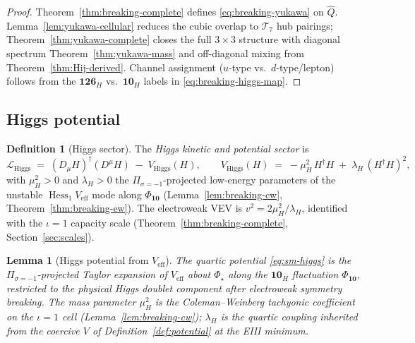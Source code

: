 \documentclass[11pt]{article}
\theoremstyle{plain}
\newtheorem{lemma}[theorem]{Lemma}
\theoremstyle{definition}
\newtheorem{definition}[theorem]{Definition}
\theoremstyle{remark}
\numberwithin{equation}{section}
\newcommand{\orderparam}{\Phi}
\newcommand{\Hess}{\operatorname{Hess}}
\begin{document}
\begin{proof}
Theorem~\ref{thm:breaking-complete} defines \eqref{eq:breaking-yukawa} on
$\hat Q$. Lemma~\ref{lem:yukawa-cellular} reduces the cubic overlap to
$\mathcal{T}_7$ hub pairings; Theorem~\ref{thm:yukawa-complete} closes the
full $3\times3$ structure with diagonal spectrum
Theorem~\ref{thm:yukawa-mass} and off-diagonal mixing from
Theorem~\ref{thm:Hij-derived}. Channel assignment
($u$-type vs.\ $d$-type/lepton) follows from the $\mathbf{126}_H$ vs.\
$\mathbf{10}_H$ labels in \eqref{eq:breaking-higgs-map}.
\end{proof}

\subsection{Higgs potential}
\label{sec:sm-lagrangian:higgs}

\begin{definition}[Higgs sector]\label{def:sm-higgs}
The \emph{Higgs kinetic and potential sector} is
\begin{equation}\label{eq:sm-higgs}
  \mathcal{L}_{\mathrm{Higgs}}
  \;=\;
  (D_\mu H)^\dagger(D^\mu H)
  \;-\;
  V_{\mathrm{Higgs}}(H),
  \qquad
  V_{\mathrm{Higgs}}(H)
  \;=\;
  -\mu_H^2\,H^\dagger H
  \;+\;
  \lambda_H\,(H^\dagger H)^2,
\end{equation}
with $\mu_H^2>0$ and $\lambda_H>0$ the $\Pi_{\sigma=-1}$-projected low-energy
parameters of the unstable $\Hess_1 V_{\mathrm{eff}}$ mode along
$\Phi_{\mathbf{10}}$ (Lemma~\ref{lem:breaking-cw},
Theorem~\ref{thm:breaking-ew}). The electroweak VEV is
$v^2=2\mu_H^2/\lambda_H$, identified with the $\iota=1$ capacity scale
(Theorem~\ref{thm:breaking-complete}, Section~\ref{sec:scales}).
\end{definition}

\begin{lemma}[Higgs potential from $V_{\mathrm{eff}}$]
\label{lem:sm-higgs-derived}
The quartic potential \eqref{eq:sm-higgs} is the $\Pi_{\sigma=-1}$-projected
Taylor expansion of $V_{\mathrm{eff}}$ about $\orderparam_\star$ along the
$\mathbf{10}_H$ fluctuation $\Phi_{\mathbf{10}}$, restricted to the physical
Higgs doublet component after electroweak symmetry breaking. The mass parameter
$\mu_H^2$ is the Coleman--Weinberg tachyonic coefficient on the $\iota=1$ cell
(Lemma~\ref{lem:breaking-cw}); $\lambda_H$ is the quartic coupling inherited
from the coercive $V$ of Definition~\ref{def:potential} at the EIII minimum.
\end{lemma}
\end{document}
